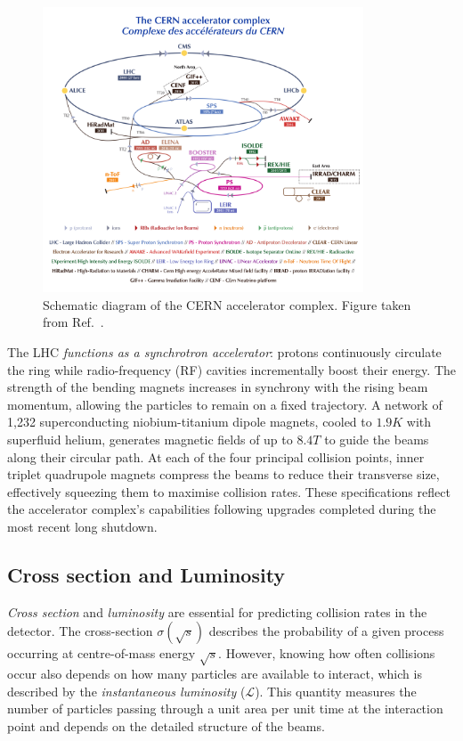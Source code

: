 \begin{figure}[!htbp]
\centering
\includegraphics[width= 0.85\textwidth]{Figures/Chapter3/LHC_AcceleratorComplex.pdf}
\caption[Schematic diagram of the CERN accelerator complex]{Schematic diagram of the \ac{CERN} accelerator complex. Figure taken from Ref.~\cite{LHC_InjectorComplex}.}
\label{Figure:Chapter3_LHC_Complex}
\end{figure}

The \ac{LHC} \textit{functions as a synchrotron accelerator}: protons continuously circulate the ring while radio-frequency (RF) cavities incrementally boost their energy. The strength of the bending magnets increases in synchrony with the rising beam momentum, allowing the particles to remain on a fixed trajectory. A network of 1,232 superconducting niobium-titanium dipole magnets, cooled to $1.9\unit{K}$ with superfluid helium, generates magnetic fields of up to $8.4\unit{T}$ to guide the beams along their circular path. At each of the four principal collision points, inner triplet quadrupole magnets compress the beams to reduce their transverse size, effectively squeezing them to maximise collision rates. These specifications reflect the accelerator complex's capabilities following upgrades completed during the most recent long shutdown.

\subsection{Cross section and Luminosity}

\textit{Cross section} and \textit{luminosity} are essential for predicting collision rates in the detector. The cross-section $\sigma(\sqrt{s})$ describes the probability of a given process occurring at centre-of-mass energy $\sqrt{s}$. However, knowing how often collisions occur also depends on how many particles are available to interact, which is described by the \textit{instantaneous luminosity} ($\mathscr{L}$). This quantity measures the number of particles passing through a unit area per unit time at the interaction point and depends on the detailed structure of the beams.

